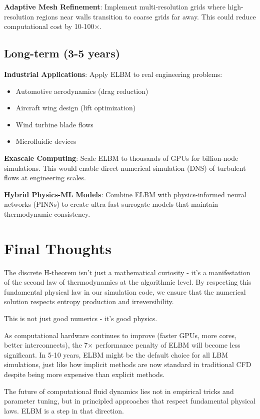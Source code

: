 \textbf{Adaptive Mesh Refinement}: Implement multi-resolution grids where high-resolution regions near walls transition to coarse grids far away. This could reduce computational cost by 10-100×.

\subsection{Long-term (3-5 years)}

\textbf{Industrial Applications}: Apply ELBM to real engineering problems:
\begin{itemize}
    \item Automotive aerodynamics (drag reduction)
    \item Aircraft wing design (lift optimization)
    \item Wind turbine blade flows
    \item Microfluidic devices
\end{itemize}

\textbf{Exascale Computing}: Scale ELBM to thousands of GPUs for billion-node simulations. This would enable direct numerical simulation (DNS) of turbulent flows at engineering scales.

\textbf{Hybrid Physics-ML Models}: Combine ELBM with physics-informed neural networks (PINNs) to create ultra-fast surrogate models that maintain thermodynamic consistency.

\section{Final Thoughts}

The discrete H-theorem isn't just a mathematical curiosity - it's a manifestation of the second law of thermodynamics at the algorithmic level. By respecting this fundamental physical law in our simulation code, we ensure that the numerical solution respects entropy production and irreversibility.

This is not just good numerics - it's good physics.

As computational hardware continues to improve (faster GPUs, more cores, better interconnects), the 7× performance penalty of ELBM will become less significant. In 5-10 years, ELBM might be the default choice for all LBM simulations, just like how implicit methods are now standard in traditional CFD despite being more expensive than explicit methods.

The future of computational fluid dynamics lies not in empirical tricks and parameter tuning, but in principled approaches that respect fundamental physical laws. ELBM is a step in that direction.

